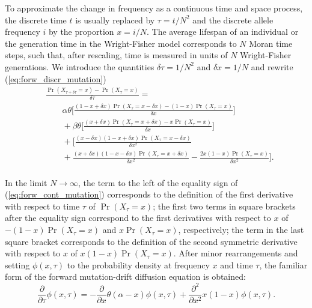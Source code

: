 \documentclass[preprint]{elsarticle}
\newcommand\x[1]{\ensuremath{X_{#1}}}
\begin{document}
To approximate the change in frequency as a continuous time and space process, the discrete time $t$ is usually replaced by $\tau = t/N^2$ and the discrete allele frequency $i$ by the proportion $x=i/N$. The average lifespan of an individual or the generation time in the Wright-Fisher model corresponds to $N$ Moran time steps, such that, after rescaling, time is measured in units of $N$ Wright-Fisher generations. We introduce the quantities $\delta \tau=1/N^2$ and $\delta x=1/N$ and rewrite (\ref{eq:forw_discr_mutation})
\begin{equation}\label{eq:forw_cont_mutation}
\begin{split}
&\frac{\Pr(\x{\tau+\delta \tau}=x)-\Pr(\x{\tau}=x)}{\delta \tau} =\\ &\qquad\alpha\theta \bigg[\frac{(1-x+\delta x)\Pr(\x{\tau}=x-\delta x) - (1-x)\Pr(\x{\tau}=x)}{\delta x}\bigg]\\
&\qquad+\beta\theta \bigg[\frac{(x+\delta x)\Pr(\x{\tau}=x+\delta x) - x\Pr(\x{\tau}=x)}{\delta x}\bigg]\\
&\qquad+\bigg[\frac{(x-\delta x)(1-x+\delta x)\Pr(\x{\tau}=x-\delta x)}{\delta x^2}\\
&\qquad+ \frac{(x+\delta x)(1-x-\delta x)\Pr(\x{\tau}=x+\delta x)}{\delta x^2}-\frac{2x(1-x)\Pr(\x{\tau}=x)}{\delta x^2}\bigg].\\
\end{split}
\end{equation}

In the limit $N \to \infty$, the term to the left of the equality sign of (\ref{eq:forw_cont_mutation}) corresponds to the definition of the first derivative with respect to time $\tau$ of $\Pr(\x{\tau}=x)$; the first two terms in square brackets after the equality sign correspond to the first derivatives with respect to $x$ of $-(1-x)\Pr(\x{\tau}=x)$ and $x\Pr(\x{\tau}=x)$, respectively; the term in the last square bracket corresponds to the definition of the second symmetric derivative with respect to $x$ of $x(1-x)\Pr(\x{\tau}=x)$.  After minor rearrangements and setting $\phi(x,\tau)$ to the probability density at frequency $x$ and time $\tau$, the familiar form of the forward mutation-drift diffusion equation is obtained:
\begin{equation}\label{eq:forw_mutdrift}
\frac{\partial}{\partial \tau} \phi(x,\tau) = -\frac{\partial}{\partial x}\theta(\alpha-x)\phi(x,\tau) +\frac{\partial^2}{\partial x^2}x(1-x)\phi(x,\tau).
\end{equation}
\end{document}
